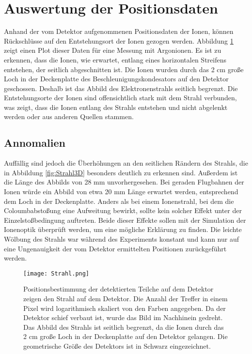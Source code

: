 \section{Auswertung der Positionsdaten}
Anhand der vom Detektor aufgenommenen Positionsdaten der Ionen, können Rückschlüsse auf den Entstehungsort der Ionen gezogen werden. Abbildung \ref{fig:Strahl} zeigt einen Plot dieser Daten für eine Messung mit Argonionen. Es ist zu erkennen, dass die Ionen, wie erwartet, entlang eines horizontalen Streifens entstehen, der seitlich abgeschnitten ist. Die Ionen wurden durch das 2 cm große Loch in der Deckenplatte des Beschleunigungskondesators auf den Detektor geschossen. Deshalb ist das Abbild des Elektronenstrahls seitlich begrenzt. Die Entstehungsorte der Ionen sind offensichtlich stark mit dem Strahl verbunden, was zeigt, dass die Ionen entlang des Strahls entstehen und nicht abgelenkt werden oder aus anderen Quellen stammen.

\subsection{Annomalien}
Auffällig sind jedoch die Überhöhungen an den seitlichen Rändern des Strahls, die in Abbildung \ref{fig:Strahl3D} besonders deutlich zu erkennen sind. Außerdem ist die Länge des Abbilds von 28 mm unvorhergesehen. Bei geraden Flugbahnen der Ionen würde ein Abbild von etwa 20 mm Länge erwartet werden, entsprechend dem Loch in der Deckenplatte. Anders als bei einem Ionenstrahl, bei dem die Coloumbabstoßung eine Aufweitung bewirkt, sollte kein solcher Effekt unter der Einzelstoßbedingung auftreten. Beide dieser Effekte sollen mit der Simulation der Ionenoptik überprüft werden, um eine mögliche Erklärung zu finden. Die leichte Wölbung des Strahls war während des Experiments konstant und kann nur auf eine Ungenauigkeit der vom Detektor ermittelten Positionen zurückgeführt werden. 
\begin{figure}
    \centering
    \texttt{[image: Strahl.png]}
    \caption[Logaritmisches Abbild des Strahls auf dem Detektor]{Positionsbestimmung der detektierten Teilche auf dem Detektor zeigen den Strahl auf dem Detektor. Die Anzahl der Treffer in einem Pixel wird logarithmisch skaliert von den Farben angegeben. Da der Detektor schief verbaut ist, wurde das Bild im Nachhinein gedreht. Das Abbild des Strahls ist seitlich begrenzt, da die Ionen durch das 2 cm große Loch in der Deckenplatte auf den Detektor gelangen. Die geometrische Größe des Detektors ist in Schwarz eingezeichnet.}
    \label{fig:Strahl} 
\end{figure}

